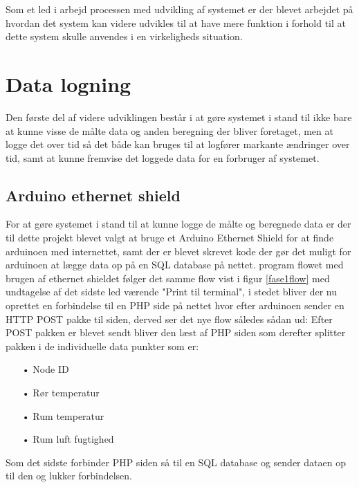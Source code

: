 Som et led i arbejd processen med udvikling af systemet er der blevet arbejdet på hvordan det system kan videre udvikles til at have mere funktion i forhold til at dette system skulle anvendes i en virkeligheds situation.

\section{Data logning}
Den første del af videre udviklingen består i at gøre systemet i stand til ikke bare at kunne visse de målte data og anden beregning der bliver foretaget, men at logge det over tid så det både kan bruges til at logfører markante ændringer over tid, samt at kunne fremvise det loggede data for en forbruger af systemet.

\subsection{Arduino ethernet shield}
For at gøre systemet i stand til at kunne logge de målte og beregnede data er der til dette projekt blevet valgt at bruge et Arduino Ethernet Shield for at finde arduinoen med internettet, samt der er blevet skrevet kode der gør det muligt for arduinoen at lægge data op på en SQL database på nettet.
\newline
program flowet med brugen af ethernet shieldet følger det samme flow vist i figur \ref{fase1flow}
med undtagelse af det sidste led værende "Print til terminal", i stedet bliver der nu oprettet en forbindelse til en PHP side på nettet hvor efter arduinoen sender en HTTP POST pakke til siden, derved ser det nye flow således sådan ud:
\newline
Efter POST pakken er blevet sendt bliver den læst af PHP siden som derefter splitter pakken i de individuelle data punkter som er:
\begin{enumerate}
	\item[•]Node ID
	\item[•]Rør temperatur
	\item[•]Rum temperatur
	\item[•]Rum luft fugtighed
\end{enumerate}
Som det sidste forbinder PHP siden så til en SQL database og sender dataen op til den og lukker forbindelsen.
